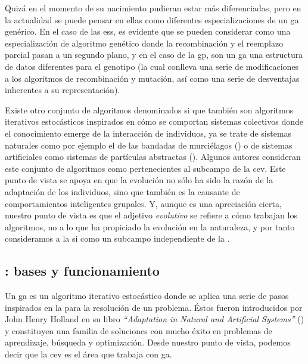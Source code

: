 Quizá en el momento de su nacimiento pudieran estar más diferenciadas, pero en la actualidad se puede pensar en ellas como diferentes especializaciones de un \gls{ga} genérico. En el caso de las \glspl{es}, es evidente que se pueden considerar como una especialización de algoritmo genético donde la recombinación y el reemplazo parcial pasan a un segundo plano, y en el caso de la \gls{gp}, son un \gls{ga} una estructura de datos diferentes para el genotipo (la cual conlleva una serie de modificaciones a los algoritmos de recombinación y mutación, así como una serie de desventajas inherentes a su representación).

Existe otro conjunto de algoritmos denominados \gls{si} que también son algoritmos iterativos estocásticos inspirados en cómo se comportan sistemas colectivos donde el conocimiento emerge de la interacción de individuos, ya se trate de sistemas naturales como por ejemplo el de las bandadas de murciélagos (\cite{Yang2010}) o de sistemas artificiales como sistemas de partículas abstractas (\cite{Artyukhin2014}). Algunos autores consideran este conjunto de algoritmos como pertenecientes al subcampo de la \gls{cev}. Este punto de vista se apoya en que la evolución no sólo ha sido la razón de la adaptación de los individuos, sino que también es la causante de comportamientos inteligentes grupales. Y, aunque es una apreciación cierta, nuestro punto de vista es que el adjetivo \textit{evolutivo} se refiere a cómo trabajan los algoritmos, no a lo que ha propiciado la evolución en la naturaleza, y por tanto consideramos a la \gls{si} como un subcampo independiente de la .

\subsection{: bases y funcionamiento}

Un \gls{ga} es un algoritmo iterativo estocástico donde se aplica una serie de pasos inspirados en la  para la resolución de un problema. Éstos fueron introducidos por John Henry Holland en su libro \textit{\enquote{Adaptation in Natural and Artificial Systems}} (\cite{Holland1975}) y constituyen una familia de soluciones con mucho éxito en problemas de aprendizaje, búsqueda y optimización. Desde nuestro punto de vista, podemos decir que la \gls{cev} es el área que trabaja con \gls{ga}.

